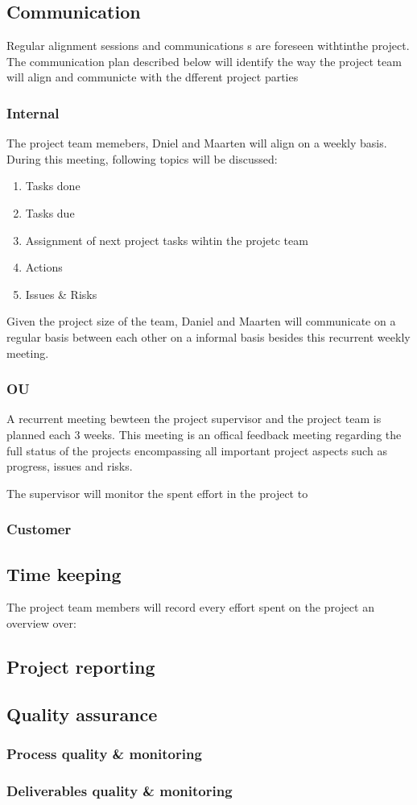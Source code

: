 \subsection{Communication}
Regular alignment sessions and communications s are foreseen withtinthe project. The communication plan described below will identify the way the project team will align and communicte with the dfferent project parties

\subsubsection{Internal}
The project team memebers, Dniel and Maarten will align on a weekly basis.
During this meeting, following topics will be discussed:
\begin{enumerate}
	\item Tasks done
	\item Tasks due
	\item Assignment of next project tasks wihtin the projetc team
	\item Actions
	\item Issues & Risks
\end {enumerate}
Given the project size of the team, Daniel and Maarten will communicate on a regular basis between each other on a informal basis besides this recurrent weekly meeting.
\subsubsection{OU}
A recurrent meeting bewteen the project supervisor and the project team is planned each 3 weeks.
This meeting is an offical feedback meeting regarding the full status of the projects encompassing all important project aspects such as progress, issues and risks. 

The supervisor will monitor the spent effort in the project to 

\subsubsection{Customer}
\lipsum[1]

\subsection{Time keeping}
The project team members will record every effort spent on the project an overview over:


\subsection{Project reporting}
\lipsum[1]

\subsection{Quality assurance}
\lipsum[1]

\subsubsection{Process quality \& monitoring}
\lipsum[1]

\subsubsection{Deliverables quality \& monitoring}
\lipsum[1]
